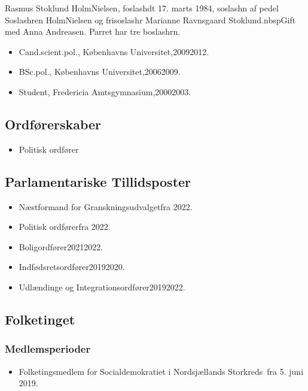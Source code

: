\documentclass[11pt, a4paper]{awesome-cv}
\begin{document}
\makecvheader[R]
\makelettertitle
\begin{cvletter}
Rasmus Stoklund HolmNielsen, foslashdt 17. marts 1984, soslashn af pedel Soslashren HolmNielsen og frisoslashr Marianne Ravnsgaard Stoklund.nbspGift med Anna Andreasen. Parret har tre boslashrn.

\begin{itemize}
\item Cand.scient.pol., Københavns Universitet,20092012.
\item BSc.pol., Københavns Universitet,20062009.
\item Student, Fredericia Amtsgymnasium,20002003.
\end{itemize}
\subsection*{Ordførerskaber}
\begin{itemize}
\item Politisk ordfører
\end{itemize}
\subsection*{Parlamentariske Tillidsposter}
\begin{itemize}
\item Næstformand for Granskningsudvalgetfra 2022.
\item Politisk ordførerfra 2022.
\item Boligordfører20212022.
\item Indfødsretsordfører20192020.
\item Udlændinge og Integrationsordfører20192022.
\end{itemize}
\subsection*{Folketinget}
\subsubsection*{Medlemsperioder}
\begin{itemize}
\item Folketingsmedlem for Socialdemokratiet i Nordsjællands Storkreds fra 5. juni 2019.
\end{itemize}

\end{cvletter}
\end{document}
